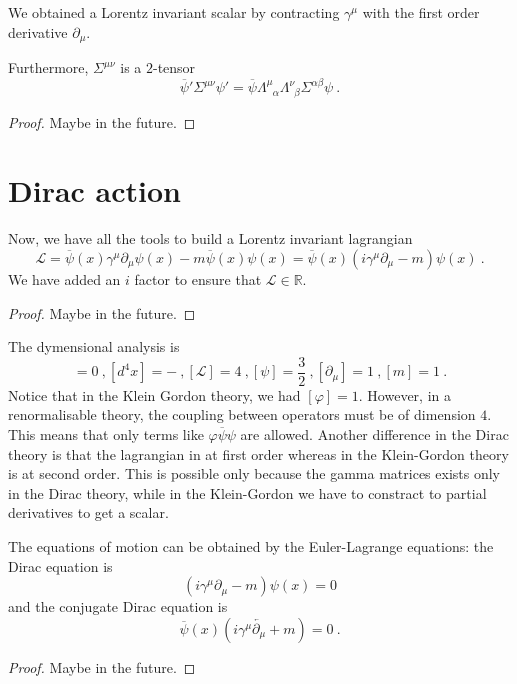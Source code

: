     We obtained a Lorentz invariant scalar by contracting $\gamma^\mu$ with the first order derivative $\partial_\mu$. 

    Furthermore, $\Sigma^{\mu\nu}$ is a $2$-tensor 
    \begin{equation*}
        \overline \psi' \Sigma^{\mu\nu} \psi' = \overline \psi \Lambda^\mu_{\phantom \mu \alpha} \Lambda^\nu_{\phantom \nu \beta} \Sigma^{\alpha\beta} \psi ~.
    \end{equation*}
    \begin{proof}
        Maybe in the future.
    \end{proof}

\section{Dirac action}

    Now, we have all the tools to build a Lorentz invariant lagrangian
    \begin{equation*}
        \mathcal L = \overline \psi (x) \gamma^\mu \partial_\mu \psi(x) - m \overline \psi (x) \psi (x) = \overline \psi (x) (i \gamma^\mu \partial_\mu - m) \psi(x) ~.
    \end{equation*}
    We have added an $i$ factor to ensure that $\mathcal L \in \mathbb R$.
    \begin{proof}
        Maybe in the future.
    \end{proof}

    The dymensional analysis is 
    \begin{equation*}
        [S] = 0 ~, [d^4 x] = - ~, [\mathcal L] = 4~, [\psi] = \frac{3}{2} ~, [\partial_\mu] = 1 ~, [m] = 1 ~.
    \end{equation*}
    Notice that in the Klein Gordon theory, we had $[\varphi] = 1$. However, in a renormalisable theory, the coupling between operators must be of dimension $4$. This means that only terms like $\varphi \overline \psi \psi$ are allowed. Another difference in the Dirac theory is that the lagrangian in at first order whereas in the Klein-Gordon theory is at second order. This is possible only because the gamma matrices exists only in the Dirac theory, while in the Klein-Gordon we have to constract to partial derivatives to get a scalar.

    The equations of motion can be obtained by the Euler-Lagrange equations: the Dirac equation is 
    \begin{equation*}
        (i \gamma^\mu \partial_\mu - m) \psi(x) = 0
    \end{equation*}
    and the conjugate Dirac equation is 
    \begin{equation*}
        \overline \psi(x) (i \gamma^\mu \overleftarrow{\partial_\mu} + m) = 0 ~.
    \end{equation*}
    \begin{proof}
        Maybe in the future.
    \end{proof}

